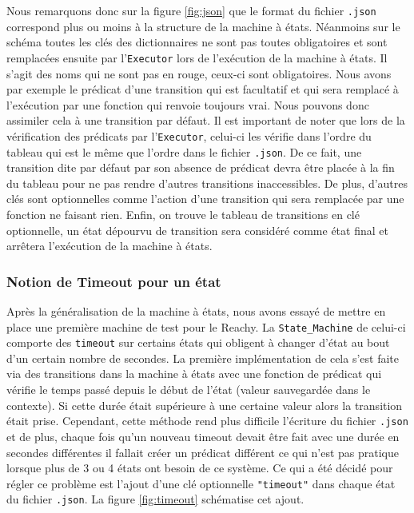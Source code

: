 \documentclass[a4paper,french]{article}
\begin{document}
Nous remarquons donc sur la figure \ref{fig:json} que le format du fichier \texttt{.json} correspond plus ou moins à la structure de la machine à états. Néanmoins sur le schéma toutes les clés des dictionnaires ne sont pas toutes obligatoires et sont remplacées ensuite par l'\texttt{Executor} lors de l'exécution de la machine à états. Il s'agit des noms qui ne sont pas en rouge, ceux-ci sont obligatoires. Nous avons par exemple le prédicat d'une transition qui est facultatif et qui sera remplacé à l'exécution par une fonction qui renvoie toujours vrai. Nous pouvons donc assimiler cela à une transition par défaut. Il est important de noter que lors de la vérification des prédicats par l'\texttt{Executor}, celui-ci les vérifie dans l'ordre du tableau qui est le même que l'ordre dans le fichier \texttt{.json}. De ce fait, une transition dite par défaut par son absence de prédicat devra être placée à la fin du tableau pour ne pas rendre d'autres transitions inaccessibles. De plus, d'autres clés sont optionnelles comme l'action d'une transition qui sera remplacée par une fonction ne faisant rien. Enfin, on trouve le tableau de transitions en clé optionnelle, un état dépourvu de transition sera considéré comme état final et arrêtera l'exécution de la machine à états.

\subsubsection{Notion de Timeout pour un état}

Après la généralisation de la machine à états, nous avons essayé de mettre en place une première machine de test pour le Reachy. La \texttt{State\_Machine} de celui-ci comporte des \texttt{timeout} sur certains états qui obligent à changer d'état au bout d'un certain nombre de secondes. La première implémentation de cela s'est faite via des transitions dans la machine à états avec une fonction de prédicat qui vérifie le temps passé depuis le début de l'état (valeur sauvegardée dans le contexte). Si cette durée était supérieure  à une certaine valeur alors la transition était prise. Cependant, cette méthode rend plus difficile l'écriture du fichier \texttt{.json} et de plus, chaque fois qu'un nouveau timeout devait être fait avec une durée en secondes différentes il fallait créer un prédicat différent ce qui n'est pas pratique lorsque plus de 3 ou 4 états ont besoin de ce système. Ce qui a été décidé pour régler ce problème est l'ajout d'une clé optionnelle \texttt{"timeout"} dans chaque état du fichier \texttt{.json}. La figure \ref{fig:timeout} schématise cet ajout.
\end{document}
